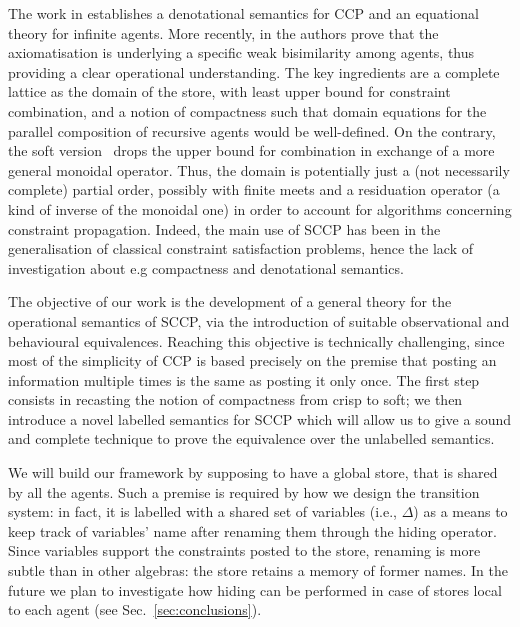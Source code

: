 \documentclass[main.tex]{subfiles}
\begin{document}
 
The work in \cite{popl91} establishes a denotational semantics
for CCP and an equational theory for infinite agents. More recently, in \cite{pippo} the authors
prove that the axiomatisation is underlying a specific weak bisimilarity among agents,
thus providing a clear operational understanding.
%
The key ingredients are a complete lattice as the domain of the store, with least upper bound for constraint
combination, and a notion of compactness such that domain equations for 
the parallel composition of 
recursive agents would be well-defined.
On the contrary, the soft version~\cite{scc} drops the upper bound for combination
in exchange of a more general monoidal operator. Thus, the domain is potentially just a (not
necessarily complete) partial order, possibly with finite meets and a residuation operator (a kind of
inverse of the monoidal one) in order to account for algorithms concerning constraint propagation.
%
Indeed, the main use of SCCP has been in the generalisation of classical constraint satisfaction
problems, hence 
the lack of investigation about e.g compactness and denotational semantics. 


The objective of our work is the development of a general theory for the operational %
semantics
of SCCP, via the introduction of suitable observational and behavioural equivalences.
%
Reaching this objective is technically challenging, since most of the simplicity of CCP is based precisely 
on the premise that posting an information multiple times is the same as posting it only once. The first step consists in recasting the notion of compactness from crisp to soft;
we  then introduce a novel labelled semantics for SCCP which will allow us to give a sound and complete  
technique to prove the  equivalence over the unlabelled semantics.


We will build our framework by supposing to have a global store, that is shared by all the agents. Such a premise is required by how we design the  transition system: in fact, it is labelled with a shared set of variables (i.e., $\Delta$)  as a means to keep track of variables' name after renaming them through the hiding operator. Since variables support the constraints posted to the store, renaming is more subtle than in other algebras: the store retains a memory of former names. In the future we plan to investigate how hiding can be performed in case of stores local to each agent (see Sec.~\ref{sec:conclusions}).
\end{document}
